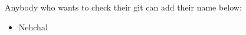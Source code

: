 \documentclass[11pt]{article}
\begin{document}
Anybody who wants to check their git can add their name below:
\begin{itemize}
    \item Nehchal
\end{itemize}
\end{document}
